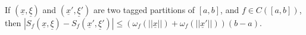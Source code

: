 \begin{theorem}
    If $(\underline{x}, \underline{\xi})$ and $(\underline{x}', \underline{\xi}')$ are two tagged partitions of $[a,b]$, and $f \in C([a,b])$, then $|S_f(\underline{x}, \underline{\xi}) - S_f(\underline{x}', \underline{\xi}')| \leq (\omega_f(||\underline{x}||) + \omega_f(||\underline{x}'||))(b-a)$.
\end{theorem}